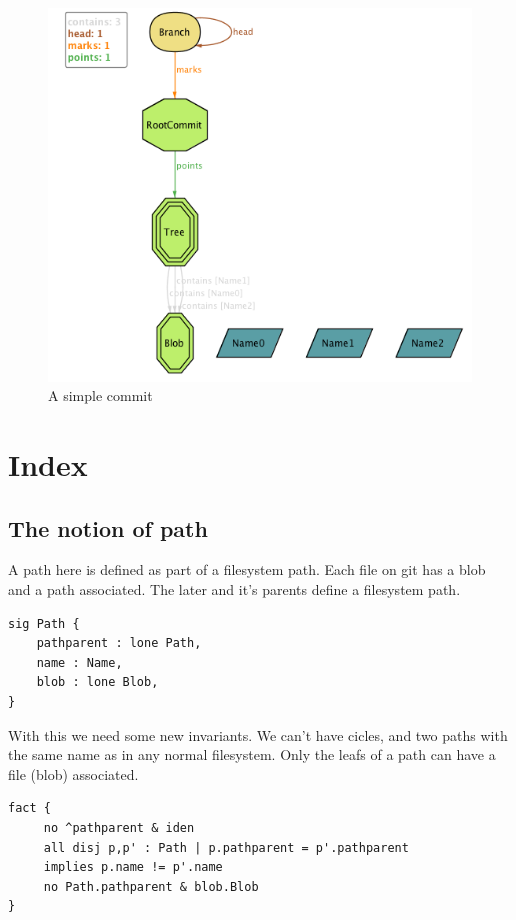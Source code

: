 \begin{figure}[h!]
	\caption{A simple commit}
  \centering
    \includegraphics[scale=0.65]{images/image1.png}
\end{figure}


\section{Index}

\subsection{The notion of path}

A path here is defined as part of a filesystem path. 
Each file on git has a blob and a path associated. 
The later and it's parents define a filesystem path.

\begin{lstlisting}
sig Path {
	pathparent : lone Path,
	name : Name,
	blob : lone Blob,
}
\end{lstlisting}

With this we need some new invariants.
We can't have cicles, and two paths with the same
name as in any normal filesystem.
Only the leafs of a path can have a file (blob) associated.

\begin{lstlisting}
fact {
	 no ^pathparent & iden
	 all disj p,p' : Path | p.pathparent = p'.pathparent
	 implies p.name != p'.name
	 no Path.pathparent & blob.Blob
}
\end{lstlisting}

